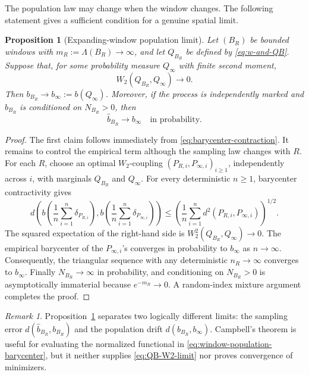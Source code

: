 \documentclass[11pt,a4paper]{article}
\newtheorem{proposition}[theorem]{Proposition}
\theoremstyle{remark}
\newtheorem{remark}[theorem]{Remark}
\begin{document}
The population law may change when the window changes.  The following statement gives a sufficient condition for a genuine spatial limit.

\begin{proposition}[Expanding-window population limit]
\label{prop:window-limit}
Let \((B_R)\) be bounded windows with \(m_R:=\Lambda(B_R)\to\infty\), and let \(Q_{B_R}\) be defined by \eqref{eq:w-and-QB}.  Suppose that, for some probability measure \(Q_\infty\) with finite second moment,
\begin{equation}
\label{eq:QB-W2-limit}
 W_2(Q_{B_R},Q_\infty)\longrightarrow0.
\end{equation}
Then \(b_{B_R}\to b_\infty:=b(Q_\infty)\).  Moreover, if the process is independently marked and \(\widehat b_{B_R}\) is conditioned on \(N_{B_R}>0\), then
\[
 \widehat b_{B_R}\longrightarrow b_\infty
 \quad\text{in probability}.
\]
\end{proposition}

\begin{proof}
The first claim follows immediately from \eqref{eq:barycenter-contraction}.  It remains to control the empirical term although the sampling law changes with \(R\).  For each \(R\), choose an optimal \(W_2\)-coupling \((P_{R,i},P_{\infty,i})_{i\ge1}\), independently across \(i\), with marginals \(Q_{B_R}\) and \(Q_\infty\).  For every deterministic \(n\ge1\), barycenter contractivity gives
\[
 d\!\left(
 b\!\left(\frac1n\sum_{i=1}^n\delta_{P_{R,i}}\right),
 b\!\left(\frac1n\sum_{i=1}^n\delta_{P_{\infty,i}}\right)
 \right)
 \le
 \left(\frac1n\sum_{i=1}^n d^2(P_{R,i},P_{\infty,i})\right)^{1/2}.
\]
The squared expectation of the right-hand side is \(W_2^2(Q_{B_R},Q_\infty)\to0\).  The empirical barycenter of the \(P_{\infty,i}\)'s converges in probability to \(b_\infty\) as \(n\to\infty\).  Consequently, the triangular sequence with any deterministic \(n_R\to\infty\) converges to \(b_\infty\).  Finally \(N_{B_R}\to\infty\) in probability, and conditioning on \(N_{B_R}>0\) is asymptotically immaterial because \(e^{-m_R}\to0\).  A random-index mixture argument completes the proof.
\end{proof}

\begin{remark}
\label{rem:no-global-integral}
Proposition~\ref{prop:window-limit} separates two logically different limits: the sampling error \(d(\widehat b_{B_R},b_{B_R})\) and the population drift \(d(b_{B_R},b_\infty)\).  Campbell's theorem is useful for evaluating the normalized functional in \eqref{eq:window-population-barycenter}, but it neither supplies \eqref{eq:QB-W2-limit} nor proves convergence of minimizers.
\end{remark}
\end{document}
